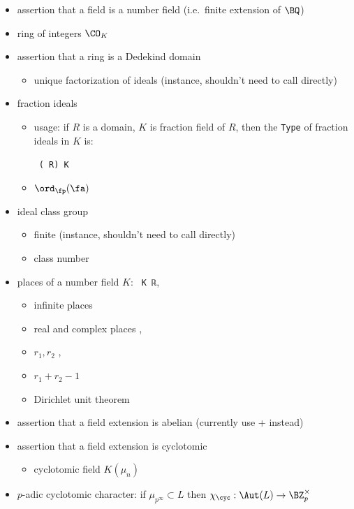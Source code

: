 \begin{itemize}
\item
assertion that a field is a number field (i.e.~finite extension of $\BQ$)
\item
ring of integers $\CO_K$ 
\item
assertion that a ring is a Dedekind domain 
\begin{itemize}
\item
unique factorization of ideals 
(instance, shouldn't need to call directly)
\end{itemize}
\item
fraction ideals 
\begin{itemize}
\item
usage: if $R$ is a domain, $K$ is fraction field of $R$,
then the \verb|Type| of fraction ideals in $K$ is:

\verb| (|\verb| R) K|
\item
$\ord_\fp(\fa)$ 
\end{itemize}
\item
ideal class group 
\begin{itemize}
\item
finite 
(instance, shouldn't need to call directly)
\item
class number 
\end{itemize}
\item
places of a number field $K$:
\verb| K ℝ|, 
\begin{itemize}
\item
infinite places 
\item
real and complex places
,
\item
$r_1,r_2$
,
\item
$r_1+r_2-1$
\item
Dirichlet unit theorem
\end{itemize}
\item
assertion that a field extension is abelian
(currently use  +  instead)
\item
assertion that a field extension is cyclotomic
\begin{itemize}
\item
cyclotomic field $K(\mu_n)$
\end{itemize}
\item
$p$-adic cyclotomic character:
if $\mu_{p^\infty}\subset L$
then $\chi_\cyc:\Aut(L)\to\BZ_p^\times$
\end{itemize}

